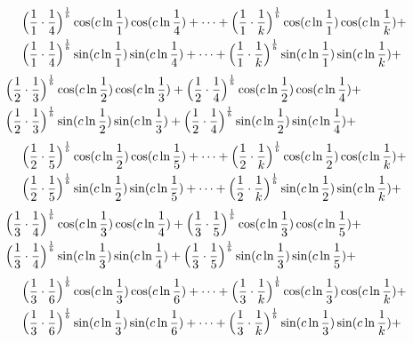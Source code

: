 \documentclass{amsart}
\begin{document}
	\[
	\begin{aligned}
		\qquad\qquad\quad & \Bigl( \frac{1}{1} \cdot \frac{1}{4} \Bigr)^\frac1b \cos(c \ln \frac{1}{1}) \cos(c \ln \frac{1}{4}) + \dots + \Bigl( \frac{1}{1} \cdot \frac{1}{k} \Bigr)^\frac1b \cos(c \ln \frac{1}{1}) \cos(c \ln \frac{1}{k}) + \\
		& \Bigl( \frac{1}{1} \cdot \frac{1}{4} \Bigr)^\frac1b \sin(c \ln \frac{1}{1}) \sin(c \ln \frac{1}{4}) + \dots + \Bigl( \frac{1}{1} \cdot \frac{1}{k} \Bigr)^\frac1b \sin(c \ln \frac{1}{1}) \sin(c \ln \frac{1}{k}) +
	\end{aligned}
	\]
	\[
	\begin{aligned}
		& \Bigl( \frac{1}{2} \cdot \frac{1}{3} \Bigr)^\frac1b \cos(c \ln \frac{1}{2}) \cos(c \ln \frac{1}{3}) + \Bigl( \frac{1}{2} \cdot \frac{1}{4} \Bigr)^\frac1b \cos(c \ln \frac{1}{2}) \cos(c \ln \frac{1}{4}) + \\
		& \Bigl( \frac{1}{2} \cdot \frac{1}{3} \Bigr)^\frac1b \sin(c \ln \frac{1}{2}) \sin(c \ln \frac{1}{3}) + \Bigl( \frac{1}{2} \cdot \frac{1}{4} \Bigr)^\frac1b \sin(c \ln \frac{1}{2}) \sin(c \ln \frac{1}{4}) + 
	\end{aligned}
	\]
	\[
	\begin{aligned}
		\qquad\qquad\quad & \Bigl( \frac{1}{2} \cdot \frac{1}{5} \Bigr)^\frac1b \cos(c \ln \frac{1}{2}) \cos(c \ln \frac{1}{5}) + \dots + \Bigl( \frac{1}{2} \cdot \frac{1}{k} \Bigr)^\frac1b \cos(c \ln \frac{1}{2}) \cos(c \ln \frac{1}{k}) + \\
		& \Bigl( \frac{1}{2} \cdot \frac{1}{5} \Bigr)^\frac1b \sin(c \ln \frac{1}{2}) \sin(c \ln \frac{1}{5}) + \dots + \Bigl( \frac{1}{2} \cdot \frac{1}{k} \Bigr)^\frac1b \sin(c \ln \frac{1}{2}) \sin(c \ln \frac{1}{k}) +
	\end{aligned}
	\]
	\[
	\begin{aligned}
		& \Bigl( \frac{1}{3} \cdot \frac{1}{4} \Bigr)^\frac1b \cos(c \ln \frac{1}{3}) \cos(c \ln\frac{1}{4}) + \Bigl( \frac{1}{3} \cdot \frac{1}{5} \Bigr)^\frac1b \cos(c \ln \frac{1}{3}) \cos(c \ln \frac{1}{5}) + \\
		& \Bigl( \frac{1}{3} \cdot \frac{1}{4} \Bigr)^\frac1b \sin(c \ln \frac{1}{3}) \sin(c \ln \frac{1}{4}) + \Bigl( \frac{1}{3} \cdot \frac{1}{5} \Bigr)^\frac1b \sin(c \ln \frac{1}{3}) \sin(c \ln \frac{1}{5}) + 
	\end{aligned}
	\]
	\[
	\begin{aligned}
		\qquad\qquad\quad & \Bigl( \frac{1}{3} \cdot \frac{1}{6} \Bigr)^\frac1b \cos(c \ln \frac{1}{3}) \cos(c \ln \frac{1}{6}) + \dots + \Bigl( \frac{1}{3} \cdot \frac{1}{k} \Bigr)^\frac1b \cos(c \ln \frac{1}{3}) \cos(c \ln \frac{1}{k}) + \\
		& \Bigl( \frac{1}{3} \cdot \frac{1}{6} \Bigr)^\frac1b \sin(c \ln \frac{1}{3}) \sin(c \ln \frac{1}{6}) + \dots + \Bigl( \frac{1}{3} \cdot \frac{1}{k} \Bigr)^\frac1b \sin(c \ln \frac{1}{3}) \sin(c \ln \frac{1}{k}) +
	\end{aligned}
	\]
	
\end{document}
